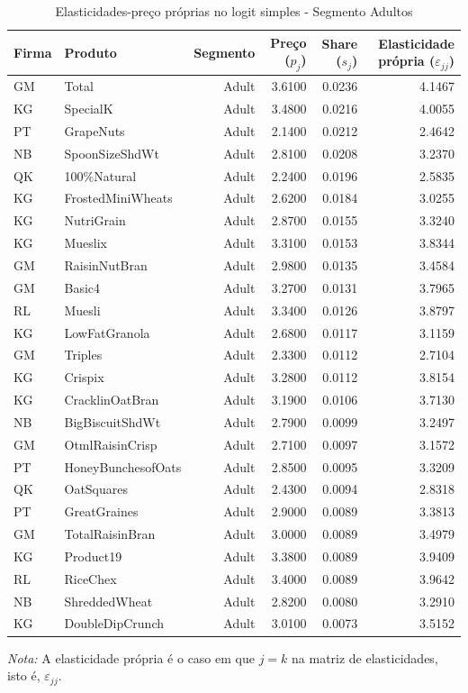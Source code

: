 \begingroup
\begin{table}[H]
\centering
\caption{Elasticidades-preço próprias no logit simples - Segmento Adultos}
\label{tab:own-elasticities-simple-adult}
\small
\begin{tabular}{llrrrr}
\toprule
Firma & Produto & Segmento & Preço ($p_j$) & Share ($s_j$) & Elasticidade própria ($\varepsilon_{jj}$) \\
\midrule
GM & Total & Adult & 3.6100 & 0.0236 & 4.1467 \\
KG & SpecialK & Adult & 3.4800 & 0.0216 & 4.0055 \\
PT & GrapeNuts & Adult & 2.1400 & 0.0212 & 2.4642 \\
NB & SpoonSizeShdWt & Adult & 2.8100 & 0.0208 & 3.2370 \\
QK & 100\%Natural & Adult & 2.2400 & 0.0196 & 2.5835 \\
KG & FrostedMiniWheats & Adult & 2.6200 & 0.0184 & 3.0255 \\
KG & NutriGrain & Adult & 2.8700 & 0.0155 & 3.3240 \\
KG & Mueslix & Adult & 3.3100 & 0.0153 & 3.8344 \\
GM & RaisinNutBran & Adult & 2.9800 & 0.0135 & 3.4584 \\
GM & Basic4 & Adult & 3.2700 & 0.0131 & 3.7965 \\
RL & Muesli & Adult & 3.3400 & 0.0126 & 3.8797 \\
KG & LowFatGranola & Adult & 2.6800 & 0.0117 & 3.1159 \\
GM & Triples & Adult & 2.3300 & 0.0112 & 2.7104 \\
KG & Crispix & Adult & 3.2800 & 0.0112 & 3.8154 \\
KG & CracklinOatBran & Adult & 3.1900 & 0.0106 & 3.7130 \\
NB & BigBiscuitShdWt & Adult & 2.7900 & 0.0099 & 3.2497 \\
GM & OtmlRaisinCrisp & Adult & 2.7100 & 0.0097 & 3.1572 \\
PT & HoneyBunchesofOats & Adult & 2.8500 & 0.0095 & 3.3209 \\
QK & OatSquares & Adult & 2.4300 & 0.0094 & 2.8318 \\
PT & GreatGraines & Adult & 2.9000 & 0.0089 & 3.3813 \\
GM & TotalRaisinBran & Adult & 3.0000 & 0.0089 & 3.4979 \\
KG & Product19 & Adult & 3.3800 & 0.0089 & 3.9409 \\
RL & RiceChex & Adult & 3.4000 & 0.0089 & 3.9642 \\
NB & ShreddedWheat & Adult & 2.8200 & 0.0080 & 3.2910 \\
KG & DoubleDipCrunch & Adult & 3.0100 & 0.0073 & 3.5152 \\
\bottomrule
\end{tabular}

\vspace{0.3em}
\footnotesize
\textit{Nota:} A elasticidade própria é o caso em que $j=k$ na matriz de elasticidades, isto é, $\varepsilon_{jj}$.
\end{table}
\endgroup

